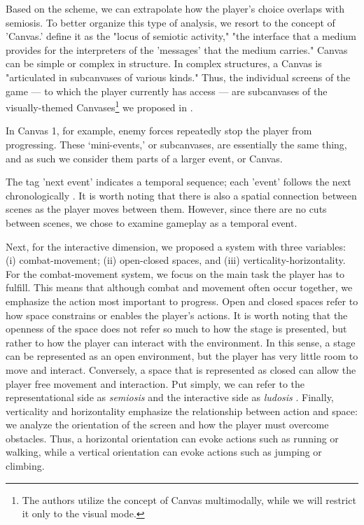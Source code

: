 \documentclass[english]{textolivre}
\begin{document}
Based on the scheme, we can extrapolate how the player's choice overlaps with semiosis. To better organize this type of analysis, we resort to the concept of 'Canvas.' \textcite[p. 101]{bateman_multimodality:_2017} define it as the "locus of semiotic activity," "the interface that a medium provides for the interpreters of the 'messages' that the medium carries." Canvas can be simple or complex in structure. In complex structures, a Canvas is "articulated in subcanvases of various kinds." Thus, the individual screens of the game — to which the player currently has access — are subcanvases of the visually-themed Canvases\footnote{The authors utilize the concept of Canvas multimodally, while we will restrict it only to the visual mode.} we proposed in .

In Canvas 1, for example, enemy forces repeatedly stop the player from progressing. These ‘mini-events,’ or subcanvases, are essentially the same thing, and as such we consider them parts of a larger event, or Canvas.

The tag 'next event' indicates a temporal sequence; each 'event' follows the next chronologically \cite[p. 225]{van_leeuwen_introducing_2005}. It is worth noting that there is also a spatial connection between scenes as the player moves between them. However, since there are no cuts between scenes, we chose to examine gameplay as a temporal event.

Next, for the interactive dimension, we proposed a system with three variables: (i) combat-movement; (ii) open-closed spaces, and (iii) verticality-horizontality. For the combat-movement system, we focus on the main task the player has to fulfill. This means that although combat and movement often occur together, we emphasize the action most important to progress. Open and closed spaces refer to how space constrains or enables the player's actions. It is worth noting that the openness of the space does not refer so much to how the stage is presented, but rather to how the player can interact with the environment. In this sense, a stage can be represented as an open environment, but the player has very little room to move and interact. Conversely, a space that is represented as closed can allow the player free movement and interaction. Put simply, we can refer to the representational side as \textit{semiosis} and the interactive side as \textit{ludosis} \cite[p. 19]{mayra_introduction_2008}. Finally, verticality and horizontality emphasize the relationship between action and space: we analyze the orientation of the screen and how the player must overcome obstacles. Thus, a horizontal orientation can evoke actions such as running or walking, while a vertical orientation can evoke actions such as jumping or climbing.
\end{document}
